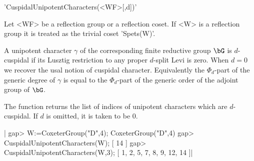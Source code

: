 'CuspidalUnipotentCharacters(<WF>[,d])'

Let  <WF>  be  a  reflection  group  or  a  reflection  coset.  If <W> is a
reflection  group it is  treated as the  trivial coset 'Spets(W)'.

A  unipotent character $\gamma$ of the corresponding finite reductive group
$\bG$  is $d$-cuspidal if  its Lusztig restriction  to any proper $d$-split
Levi  is zero. When $d=0$ we recover the usal notion of cuspidal character.
Equivalently  the $\Phi_d$-part of the generic  degree of $\gamma$ is equal
to the $\Phi_d$-part of the generic order of the adjoint group of $\bG$.

The function returns the list of indices of unipotent characters which are
$d$-cuspidal. If $d$ is omitted, it is taken to be $0$.

|    gap> W:=CoxeterGroup("D",4);        
    CoxeterGroup("D",4)
    gap> CuspidalUnipotentCharacters(W);
    [ 14 ]
    gap> CuspidalUnipotentCharacters(W,3);
    [ 1, 2, 5, 7, 8, 9, 12, 14 ]|

